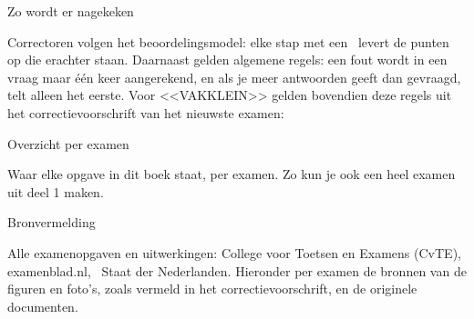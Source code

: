 \documentclass[11pt,twoside]{book}
\begin{document}




\renewcommand\Tab{0}\renewcommand\kopL{Uitwerkingen}\renewcommand\kopR{Zo wordt er nagekeken}
\label{nakijken}
{\sffamily\zwart\fontsize{15}{18}\selectfont Zo wordt er nagekeken}\par\vskip 5pt
{\opmaakproza\small Correctoren volgen het beoordelingsmodel: elke stap met een \textbullet\ levert de punten op die
erachter staan. Daarnaast gelden algemene regels: een fout wordt in een vraag maar \'e\'en keer aangerekend, en als je
meer antwoorden geeft dan gevraagd, telt alleen het eerste. Voor <<VAKKLEIN>> gelden bovendien deze regels uit het
correctievoorschrift van het nieuwste examen:\par}
\vskip 6pt

\clearpage

\clearpage


\clearpage
{}\renewcommand\Tab{0}\renewcommand\kopL{Overzicht}\renewcommand\kopR{Overzicht per examen}
\label{register}
{\sffamily\zwart\fontsize{17}{20}\selectfont Overzicht per examen}\par\vskip 4pt
{\small Waar elke opgave in dit boek staat, per examen. Zo kun je ook een heel examen uit deel 1 maken.\par}

\clearpage
\renewcommand\kopL{Bronnen}\renewcommand\kopR{Bronvermelding}
\label{bronnen}
{\sffamily\zwart\fontsize{17}{20}\selectfont Bronvermelding}\par\vskip 4pt
{\small Alle examenopgaven en uitwerkingen: College voor Toetsen en Examens (CvTE), examenblad.nl, \textcopyright\ Staat der Nederlanden.
Hieronder per examen de bronnen van de figuren en foto's, zoals vermeld in het correctievoorschrift, en de originele documenten.\par}
{\raggedright\par}
\end{document}
